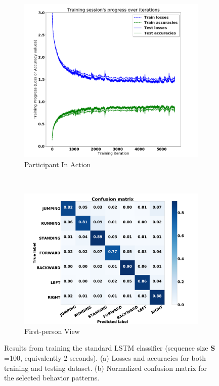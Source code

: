 \documentclass[review]{vgtc}                 %
\begin{document}
\begin{figure}[!htbp]
	\centering
	\begin{subfigure}{0.43\linewidth}
		\centering
		\includegraphics[width=\linewidth]{./figs/accuracy_loss.png}
		\caption[]{\label{fig:accuracy_loss} Participant In Action
		}
	\end{subfigure}
	~
	\begin{subfigure}{0.5\linewidth}
		\centering	
		\includegraphics[width=\linewidth]{./figs/confusion_matrix.jpg}
		\caption[]{\label{fig:confusion_matrix} First-person View
		}
	\end{subfigure}			
	\caption[]{\label{fig:training_lstm}
		Results from training the standard LSTM classifier (sequence size $\mathbf{S}$=100, equivalently 2 seconds). (a) Losses and accuracies for both training and testing dataset. (b) Normalized confusion matrix for the selected behavior patterns.
	}
\end{figure}
\end{document}
